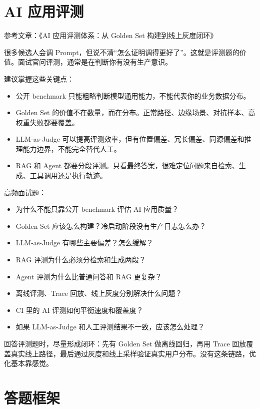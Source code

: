 \documentclass[9pt,a4paper,twocolumn]{ctexart}
\begin{document}
\section*{AI 应用评测}


参考文章：《AI 应用评测体系：从 Golden Set 构建到线上灰度闭环》



很多候选人会调 Prompt，但说不清“怎么证明调得更好了”。这就是评测题的价值。面试官问评测，通常是在判断你有没有生产意识。



建议掌握这些关键点：


\begin{itemize}[itemsep=1pt, topsep=2pt]
  \item 公开 benchmark 只能粗略判断模型通用能力，不能代表你的业务数据分布。
  \item Golden Set 的价值不在数量，而在分布。正常路径、边缘场景、对抗样本、高权重失败都要覆盖。
  \item LLM-as-Judge 可以提高评测效率，但有位置偏差、冗长偏差、同源偏差和推理能力边界，不能完全替代人工。
  \item RAG 和 Agent 都要分段评测。只看最终答案，很难定位问题来自检索、生成、工具调用还是执行轨迹。
\end{itemize}


高频面试题：


\begin{itemize}[itemsep=1pt, topsep=2pt]
  \item 为什么不能只靠公开 benchmark 评估 AI 应用质量？
  \item Golden Set 应该怎么构建？冷启动阶段没有生产日志怎么办？
  \item LLM-as-Judge 有哪些主要偏差？怎么缓解？
  \item RAG 评测为什么必须分检索和生成两段？
  \item Agent 评测为什么比普通问答和 RAG 更复杂？
  \item 离线评测、Trace 回放、线上灰度分别解决什么问题？
  \item CI 里的 AI 评测如何平衡速度和覆盖度？
  \item 如果 LLM-as-Judge 和人工评测结果不一致，应该怎么处理？
\end{itemize}


回答评测题时，尽量形成闭环：先有 Golden Set 做离线回归，再用 Trace 回放覆盖真实线上路径，最后通过灰度和线上采样验证真实用户分布。没有这条链路，优化基本靠感觉。



\section*{答题框架}
\end{document}
